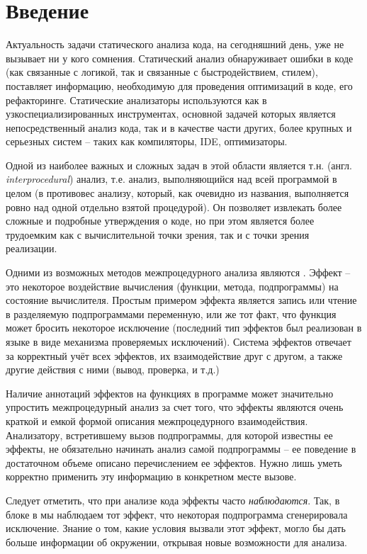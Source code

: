 \section{Введение}

Актуальность задачи статического анализа кода, на сегодняшний день, уже не вызывает ни у кого сомнения. Статический анализ обнаруживает ошибки в коде (как связанные с логикой, так и связанные с быстродействием, стилем), поставляет информацию, необходимую для проведения оптимизаций в коде, его рефакторинге. Статические анализаторы используются как в узкоспециализированных инструментах, основной задачей которых является непосредственный анализ кода, так и в качестве части других, более крупных и серьезных систем -- таких как компиляторы, IDE, оптимизаторы.

Одной из наиболее важных и сложных задач в этой области является т.н.  (англ. \textit{interprocedural}) анализ, т.е. анализ, выполняющийся над всей программой в целом (в противовес  анализу, который, как очевидно из названия, выполняется ровно над одной отдельно взятой процедурой). Он позволяет извлекать более сложные и подробные утверждения о коде, но при этом является более трудоемким как с вычислительной точки зрения, так и с точки зрения реализации.

Одними из возможных методов межпроцедурного анализа являются . Эффект -- это некоторое воздействие вычисления (функции, метода, подпрограммы) на состояние вычислителя. Простым примером эффекта является запись или чтение в разделяемую подпрограммами переменную, или же тот факт, что функция может бросить некоторое исключение (последний тип эффектов был реализован в языке  в виде механизма проверяемых исключений). Система эффектов отвечает за корректный учёт всех эффектов, их взаимодействие друг с другом, а также другие действия с ними (вывод, проверка, и т.д.)

Наличие аннотаций эффектов на функциях в программе может значительно упростить межпроцедурный анализ за счет того, что эффекты являются очень краткой и емкой формой описания межпроцедурного взаимодействия. Анализатору, встретившему вызов подпрограммы, для которой известны ее эффекты, не обязательно начинать анализ самой подпрограммы -- ее поведение в достаточном объеме описано перечислением ее эффектов. Нужно лишь уметь корректно применить эту информацию в конкретном месте вызове. 

Следует отметить, что при анализе кода эффекты часто \textit{наблюдаются}. Так, в блоке  в  мы наблюдаем тот эффект, что некоторая подпрограмма сгенерировала исключение. Знание о том, какие условия вызвали этот эффект, могло бы дать больше информации об окружении, открывая новые возможности для анализа.

